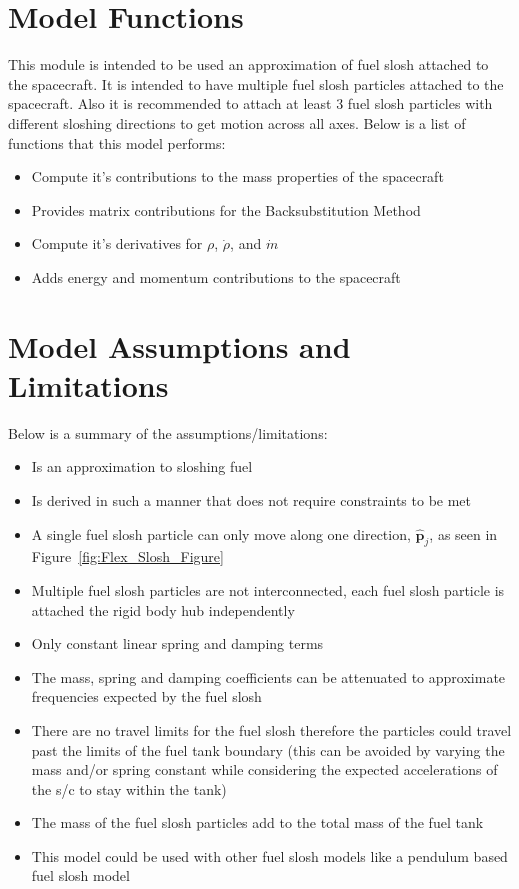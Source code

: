 \section{Model Functions}

This module is intended to be used an approximation of fuel slosh attached to the spacecraft. It is intended to have multiple fuel slosh particles attached to the spacecraft. Also it is recommended to attach at least 3 fuel slosh particles with different sloshing directions to get motion across all axes. Below is a list of functions that this model performs:

\begin{itemize}
	\item Compute it's contributions to the mass properties of the spacecraft
	\item Provides matrix contributions for the Backsubstitution Method
	\item Compute it's derivatives for $\rho$, $\dot{\rho}$, and $\dot{m}$
	\item Adds energy and momentum contributions to the spacecraft
\end{itemize}

\section{Model Assumptions and Limitations}
Below is a summary of the assumptions/limitations:

\begin{itemize}
	\item Is an approximation to sloshing fuel
	\item Is derived in such a manner that does not require constraints to be met
	\item A single fuel slosh particle can only move along one direction, $\hat{\bm p}_j$, as seen in Figure~\ref{fig:Flex_Slosh_Figure}
	\item Multiple fuel slosh particles are not interconnected, each fuel slosh particle is attached the rigid body hub independently
	\item Only constant linear spring and damping terms
	\item The mass, spring and damping coefficients can be attenuated to approximate frequencies expected by the fuel slosh
	\item There are no travel limits for the fuel slosh therefore the particles could travel past the limits of the fuel tank boundary (this can be avoided by varying the mass and/or spring constant while considering the expected accelerations of the s/c to stay within the tank)
	\item The mass of the fuel slosh particles add to the total mass of the fuel tank
	\item This model could be used with other fuel slosh models like a pendulum based fuel slosh model
\end{itemize}
